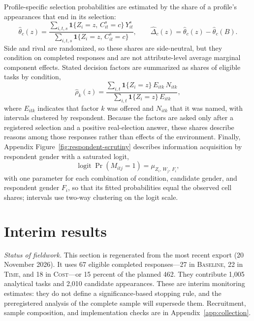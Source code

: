 \documentclass[11pt]{article}\usepackage[]{graphicx}\usepackage[]{xcolor}
\newcommand{\armT}{\textsc{Time}}
\newcommand{\armC}{\textsc{Cost}}
\newcommand{\armB}{\textsc{Baseline}}
\begin{document}
Profile-specific selection probabilities are estimated by the share of a profile's appearances that end in its selection:
\begin{equation}
\hat\theta_c(z)=\frac{\sum_{i,t,s}\mathbf 1\{Z_i=z,\,C^s_{it}=c\}\,Y^s_{it}}{\sum_{i,t,s}\mathbf 1\{Z_i=z,\,C^s_{it}=c\}},\qquad
\hat\Delta_c(z)=\hat\theta_c(z)-\hat\theta_c(B).
\label{eq:theta}
\end{equation}
Side and rival are randomized, so these shares are side-neutral, but they condition on completed responses and are not attribute-level average marginal component effects. Stated decision factors are summarized as shares of eligible tasks by condition,
\begin{equation}
\hat\rho_k(z)=\frac{\sum_{i,t}\mathbf 1\{Z_i=z\}\,E_{itk}\,N_{itk}}{\sum_{i,t}\mathbf 1\{Z_i=z\}\,E_{itk}},
\label{eq:reasons}
\end{equation}
where $E_{itk}$ indicates that factor $k$ was offered and $N_{itk}$ that it was named, with intervals clustered by respondent. Because the factors are asked only after a registered selection and a positive real-election answer, these shares describe reasons among those responses rather than effects of the environment. Finally, Appendix Figure~\ref{fig:respondent-scrutiny} describes information acquisition by respondent gender with a saturated logit,
\begin{equation}
\operatorname{logit}\Pr(M_{itj}=1)=\mu_{Z_i,\,W_j,\,F_i},
\label{eq:scrutiny}
\end{equation}
with one parameter for each combination of condition, candidate gender, and respondent gender $F_i$, so that its fitted probabilities equal the observed cell shares; intervals use two-way clustering on the logit scale.


\section{Interim results}
\label{sec:results}

\noindent\textit{Status of fieldwork.} This section is regenerated from the most recent export (20 November 2026). It uses 67 eligible completed responses---27 in \armB, 22 in \armT, and 18 in \armC---or 15 percent of the planned 462. They contribute 1,005 analytical tasks and 2,010 candidate appearances. These are interim monitoring estimates: they do not define a significance-based stopping rule, and the preregistered analysis of the complete sample will supersede them. Recruitment, sample composition, and implementation checks are in Appendix~\ref{app:collection}.
\end{document}
